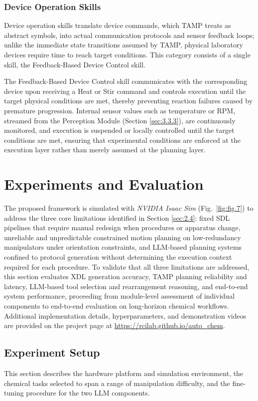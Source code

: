 \documentclass{ieeeaccess}
\begin{document}
\subsubsection{Device Operation Skills}\label{sec:3.5.2}
Device operation skills translate device commands, which TAMP treats as abstract symbols, into actual communication protocols and sensor feedback loops; unlike the immediate state transitions assumed by TAMP, physical laboratory devices require time to reach target conditions. This category consists of a single skill, the Feedback-Based Device Control skill.

The Feedback-Based Device Control skill communicates with the corresponding device upon receiving a Heat or Stir command and controls execution until the target physical conditions are met, thereby preventing reaction failures caused by premature progression. Internal sensor values such as temperature or RPM, streamed from the Perception Module (Section \ref{sec:3.3.3}), are continuously monitored, and execution is suspended or locally controlled until the target conditions are met, ensuring that experimental conditions are enforced at the execution layer rather than merely assumed at the planning layer.

\section{Experiments and Evaluation}\label{sec:4}
The proposed framework is simulated with \textit{NVIDIA Isaac Sim} (Fig.~\ref{fig:fig.7}) to address the three core limitations identified in Section \ref{sec:2.4}: fixed SDL pipelines that require manual redesign when procedures or apparatus change, unreliable and unpredictable constrained motion planning on low-redundancy manipulators under orientation constraints, and LLM-based planning systems confined to protocol generation without determining the execution context required for each procedure. To validate that all three limitations are addressed, this section evaluates XDL generation accuracy, TAMP planning reliability and latency, LLM-based tool selection and rearrangement reasoning, and end-to-end system performance, proceeding from module-level assessment of individual components to end-to-end evaluation on long-horizon chemical workflows. Additional implementation details, hyperparameters, and demonstration videos are provided on the project page at \underline{https://rcilab.github.io/auto\_chem}.



\subsection{Experiment Setup}\label{sec:4.1}
This section describes the hardware platform and simulation environment, the chemical tasks selected to span a range of manipulation difficulty, and the fine-tuning procedure for the two LLM components.
\end{document}
